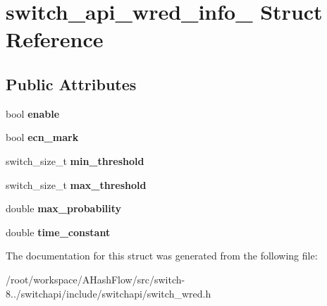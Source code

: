 \hypertarget{structswitch__api__wred__info__}{\section{switch\+\_\+api\+\_\+wred\+\_\+info\+\_\+ Struct Reference}
\label{structswitch__api__wred__info__}
}
\subsection*{Public Attributes}
\begin{DoxyCompactItemize}
\item 
\hypertarget{structswitch__api__wred__info___aa5f61bb547578acbaa219a2a05172c2f}{bool {\bfseries enable}}\label{structswitch__api__wred__info___aa5f61bb547578acbaa219a2a05172c2f}

\item 
\hypertarget{structswitch__api__wred__info___a675a54f82e29e43543dfdc2faf3e7038}{bool {\bfseries ecn\+\_\+mark}}\label{structswitch__api__wred__info___a675a54f82e29e43543dfdc2faf3e7038}

\item 
\hypertarget{structswitch__api__wred__info___a8b245e4268b8c9175fa9fa7ff703b99c}{switch\+\_\+size\+\_\+t {\bfseries min\+\_\+threshold}}\label{structswitch__api__wred__info___a8b245e4268b8c9175fa9fa7ff703b99c}

\item 
\hypertarget{structswitch__api__wred__info___a3fa8a00ad7703f95e482a72de321fc1f}{switch\+\_\+size\+\_\+t {\bfseries max\+\_\+threshold}}\label{structswitch__api__wred__info___a3fa8a00ad7703f95e482a72de321fc1f}

\item 
\hypertarget{structswitch__api__wred__info___ac21d19150f946a240b578b49eb9a20e7}{double {\bfseries max\+\_\+probability}}\label{structswitch__api__wred__info___ac21d19150f946a240b578b49eb9a20e7}

\item 
\hypertarget{structswitch__api__wred__info___aa6a9fb461658e6a6a809817529570eac}{double {\bfseries time\+\_\+constant}}\label{structswitch__api__wred__info___aa6a9fb461658e6a6a809817529570eac}

\end{DoxyCompactItemize}


The documentation for this struct was generated from the following file\+:\begin{DoxyCompactItemize}
\item 
/root/workspace/\+A\+Hash\+Flow/src/switch-\/8../switchapi/include/switchapi/switch\+\_\+wred.\+h\end{DoxyCompactItemize}
